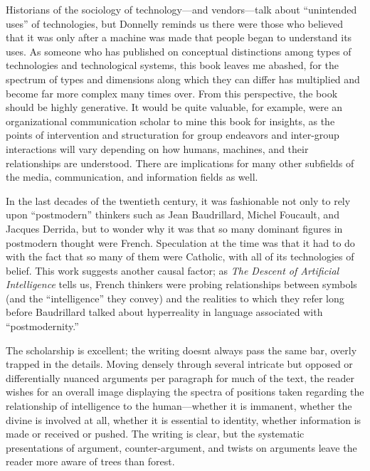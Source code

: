 \documentclass{tufte-handout}
\begin{document}
Historians of the sociology of technology---and vendors---talk about
``unintended uses'' of technologies, but Donnelly reminds us there were
those who believed that it was only after a machine was made that people
began to understand its uses. As someone who has published on conceptual
distinctions among types of technologies and technological systems, this
book leaves me abashed, for the spectrum of types and dimensions along
which they can differ has multiplied and become far more complex many
times over. From this perspective, the book should be highly generative.
It would be quite valuable, for example, were an organizational
communication scholar to mine this book for insights, as the points of
intervention and structuration for group endeavors and inter-group
interactions will vary depending on how humans, machines, and their
relationships are understood. There are implications for many other
subfields of the media, communication, and information fields as well.

In the last decades of the twentieth century, it was fashionable not
only to rely upon ``postmodern'' thinkers such as Jean Baudrillard,
Michel Foucault, and Jacques Derrida, but to wonder why it was that so
many dominant figures in postmodern thought were French. Speculation at
the time was that it had to do with the fact that so many of them were
Catholic, with all of its technologies of belief. This work suggests
another causal factor; as \emph{The Descent of Artificial Intelligence}
tells us, French thinkers were probing relationships between symbols
(and the ``intelligence'' they convey) and the realities to which they
refer long before Baudrillard talked about hyperreality in language
associated with ``postmodernity.''

The scholarship is excellent; the writing doesn\textquotesingle t always
pass the same bar, overly trapped in the details. Moving densely through
several intricate but opposed or differentially nuanced arguments per
paragraph for much of the text, the reader wishes for an overall image
displaying the spectra of positions taken regarding the relationship of
intelligence to the human---whether it is immanent, whether the divine
is involved at all, whether it is essential to identity, whether
information is made or received or pushed. The writing is clear, but the
systematic presentations of argument, counter-argument, and twists on
arguments leave the reader more aware of trees than forest.
\end{document}
